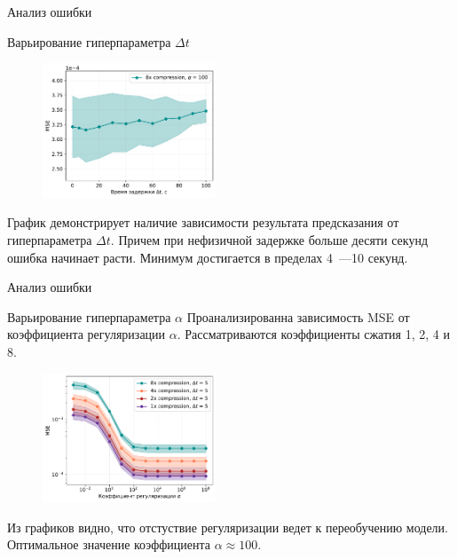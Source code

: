 \documentclass[9pt,pdf]{beamer} %
\begin{document}



\begin{frame}{Анализ ошибки}
\begin{block}{Варьирование гиперпараметра $\Delta t$}
\begin{figure}[h!]
    \centering
    \includegraphics[width=0.46\textwidth]{subs_delta_MSE_dt.pdf}
    \label{MSE_dt_main}
\end{figure}

График демонстрирует наличие зависимости результата предсказания от гиперпараметра $\Delta t$. 
Причем при нефизичной задержке больше десяти секунд ошибка начинает расти. Минимум достигается в пределах 4~---10 секунд.
\end{block}
\end{frame}

\begin{frame}{Анализ ошибки}
\begin{block}{Варьирование гиперпараметра $\alpha$}
Проанализированна зависимость MSE от коэффициента регуляризации $\alpha$.
Рассматриваются коэффициенты сжатия 1, 2, 4 и 8. 
\begin{figure}[h!]
    \centering
    \includegraphics[width=0.46\textwidth]{subs_MSE_alpha.pdf}
    \label{subs_MSE_alpha}
\end{figure}
Из графиков видно, что отстуствие регуляризации ведет к переобучению модели.
Оптимальное значение коэффициента $\alpha \approx 100$.
\end{block}
\end{frame}
\end{document}
